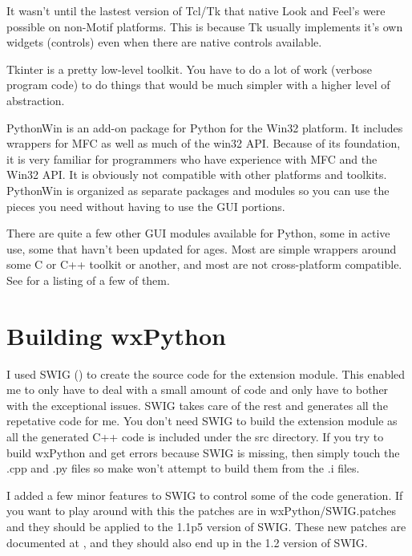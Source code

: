 It wasn't until the lastest version of Tcl/Tk that native Look and
Feel's were possible on non-Motif platforms.  This is because Tk
usually implements it's own widgets (controls) even when there are
native controls available.

Tkinter is a pretty low-level toolkit.  You have to do a lot of work
(verbose program code) to do things that would be much simpler with a higher
level of abstraction.


PythonWin is an add-on package for Python for the Win32 platform.  It
includes wrappers for MFC as well as much of the win32 API.  Because
of its foundation, it is very familiar for programmers who have
experience with MFC and the Win32 API.  It is obviously not compatible
with other platforms and toolkits.  PythonWin is organized as separate
packages and modules so you can use the pieces you need without having
to use the GUI portions.


There are quite a few other GUI modules available for Python, some in
active use, some that havn't been updated for ages.  Most are simple
wrappers around some C or C++ toolkit or another, and most are not
cross-platform compatible.  See 
for a listing of a few of them.

\section{Building wxPython}\label{wxpbuild}

I used SWIG () to
create the source code for the extension module.  This enabled me to
only have to deal with a small amount of code and only have to bother
with the exceptional issues.  SWIG takes care of the rest and
generates all the repetative code for me.  You don't need SWIG to
build the extension module as all the generated C++ code is included
under the src directory.  If you try to build wxPython and get errors
because SWIG is missing, then simply touch the .cpp and .py files so
make won't attempt to build them from the .i files.

I added a few minor features to SWIG to control some of the code
generation.  If you want to play around with this the patches are in
wxPython/SWIG.patches and they should be applied to the 1.1p5 version
of SWIG.  These new patches are documented at
,
and they should also end up in the 1.2 version of SWIG.

